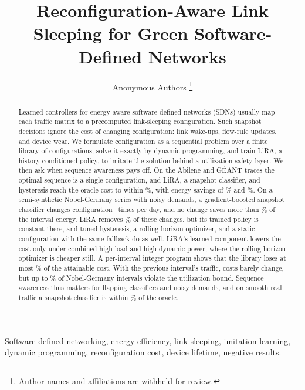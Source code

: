 \documentclass[journal]{IEEEtran}
\begin{document}
\title{Reconfiguration-Aware Link Sleeping for Green Software-Defined Networks}

\author{Anonymous Authors%
\thanks{Author names and affiliations are withheld for review.}}


\maketitle
\IEEEpeerreviewmaketitle

\begin{abstract}
Learned controllers for energy-aware software-defined networks (SDNs) usually map each traffic matrix to a precomputed link-sleeping configuration. Such snapshot decisions ignore the cost of changing configuration: link wake-ups, flow-rule updates, and device wear. We formulate configuration as a sequential problem over a finite library of configurations, solve it exactly by dynamic programming, and train LiRA, a history-conditioned policy, to imitate the solution behind a utilization safety layer. We then ask when sequence awareness pays off. On the Abilene and G\'{E}ANT traces the optimal sequence is a single configuration, and LiRA, a snapshot classifier, and hysteresis reach the oracle cost to within \realSpread\%, with energy savings of \abiSav\% and \geaSav\%. On a semi-synthetic Nobel-Germany series with noisy demands, a gradient-boosted snapshot classifier changes configuration \nobBFourchg\ times per day, and no change saves more than \gainMax\% of the interval energy. LiRA removes \nobY\% of these changes, but its trained policy is constant there, and tuned hysteresis, a rolling-horizon optimizer, and a static configuration with the same fallback do as well. LiRA's learned component lowers the cost only under combined high load and high dynamic power, where the rolling-horizon optimizer is cheaper still. A per-interval integer program shows that the library loses at most \boundMaxLoss\% of the attainable cost. With the previous interval's traffic, costs barely change, but up to \staleNobViolMax\% of Nobel-Germany intervals violate the utilization bound. Sequence awareness thus matters for flapping classifiers and noisy demands, and on smooth real traffic a snapshot classifier is within \bfourAbiGap\% of the oracle.
\end{abstract}

\begin{IEEEkeywords}
Software-defined networking, energy efficiency, link sleeping, imitation learning, dynamic programming, reconfiguration cost, device lifetime, negative results.
\end{IEEEkeywords}
\end{document}
